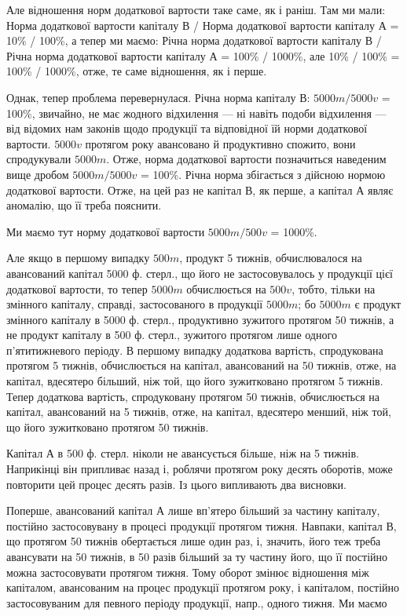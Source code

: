 \parcont{}  %
Але відношення норм додаткової вартости таке саме, як і раніш. Там ми мали:
Норма додаткової вартости капіталу В / Норма додаткової вартости капіталу А =
10\% / 100\%, а тепер ми маємо:
Річна норма додаткової вартости капіталу В / Річна норма додаткової вартости капіталу А = 100\% /
1000\%, але 10\% / 100\% = 100\% / 1000\%, отже, те саме відношення, як і перше.

Однак, тепер проблема перевернулася. Річна норма капіталу В:
$5000m / 5000v$ = 100\%, звичайно, не має жодного відхилення — ні навіть
подоби відхилення — від відомих нам законів щодо продукції та відповідної
їй норми додаткової вартости. $5000v$ протягом року авансовано й
продуктивно спожито, вони спродукували $5000m$. Отже, норма додаткової
вартости позначиться наведеним вище дробом $5000m / 5000v$ = 100\%. Річна
норма збігається з дійсною нормою додаткової вартости. Отже, на цей
раз не капітал В, як перше, а капітал А являє аномалію, що її треба
пояснити.

Ми маємо тут норму додаткової вартости $5000m / 500v$ = 1000\%.

Але якщо в першому випадку $500m$, продукт 5 тижнів, обчислювалося
на авансований капітал 5000 ф. стерл., що  його не застосовувалось
у продукції цієї додаткової вартости, то тепер $5000m$ обчислюється на $500v$,
тобто, тільки на  змінного капіталу, справді, застосованого в продукції
$5000m$; бо $5000m$ є продукт змінного капіталу в 5000 ф. стерл., продуктивно
зужитого протягом 50 тижнів, а не продукт капіталу в 500 ф. стерл.,
зужитого протягом лише одного п’ятитижневого періоду. В першому випадку
додаткова вартість, спродукована протягом 5 тижнів, обчислюється
на капітал, авансований на 50 тижнів, отже, на капітал, вдесятеро більший,
ніж той, що його зужитковано протягом 5 тижнів. Тепер додаткова вартість,
спродуковану протягом 50 тижнів, обчислюється на капітал, авансований
на 5 тижнів, отже, на капітал, вдесятеро менший, ніж той, що
його зужитковано протягом 50 тижнів.

Капітал А в 500 ф. стерл. ніколи не авансується більше, ніж на 5 тижнів.
Наприкінці він припливає назад і, роблячи протягом року десять
оборотів, може повторити цей процес десять разів. Із цього випливають
два висновки.

Поперше, авансований капітал А лише вп’ятеро більший за частину
капіталу, постійно застосовувану в процесі продукції протягом
тижня. Навпаки, капітал В, що протягом 50 тижнів обертається лише
один раз, і, значить, його теж треба авансувати на 50 тижнів, в 50 разів
більший за ту частину його, що її постійно можна застосовувати протягом
тижня. Тому оборот змінює відношення між капіталом, авансованим
на процес продукції протягом року, і капіталом, постійно застосовуваним
для певного періоду продукції, напр., одного тижня. Ми маємо
\parbreak{}  %
